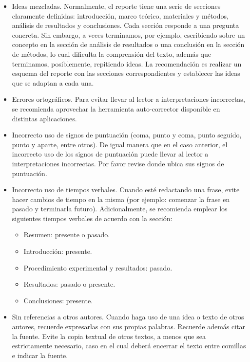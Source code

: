\begin{itemize}
    \item Ideas mezcladas. Normalmente, el reporte tiene una serie de secciones claramente definidas: introducción, marco teórico, materiales y métodos, análisis de resultados y conclusiones. Cada sección responde a una pregunta concreta. Sin embargo, a veces terminamos, por ejemplo, escribiendo sobre un concepto en la sección de análisis de resultados o una conclusión en la sección de métodos, lo cual dificulta la comprensión del texto, además que terminamos, posiblemente, repitiendo ideas. La recomendación es realizar un esquema del reporte con las secciones correspondientes y establecer las ideas que se adaptan a cada una. 

    \item Errores ortográficos. Para evitar llevar al lector a interpretaciones incorrectas, se recomienda aprovechar la herramienta auto-corrector disponible en distintas aplicaciones.

    \item Incorrecto uso de signos de puntuación (coma, punto y coma, punto seguido, punto y aparte, entre otros). De igual manera que en el caso anterior, el incorrecto uso de los signos de puntuación puede llevar al lector a interpretaciones incorrectas. Por favor revise donde ubica sus signos de puntuación. 

    \item Incorrecto uso de tiempos verbales. Cuando esté redactando una frase, evite hacer cambios de tiempo en la misma (por ejemplo: comenzar la frase en pasado y terminarla futuro). Adicionalmente, se recomienda emplear los siguientes tiempos verbales de acuerdo con la sección:

    \begin{itemize}
        \item Resumen: presente o pasado.
        \item Introducción: presente.
        \item Procedimiento experimental y resultados: pasado.
        \item Resultados: pasado o presente.
        \item Conclusiones: presente.
    \end{itemize}

    \item Sin referencias a otros autores. Cuando haga uso de una idea o texto de otros autores, recuerde expresarlas con sus propias palabras. Recuerde además citar la fuente. Evite la copia textual de otros textos, a menos que sea estrictamente necesario, caso en el cual deberá encerrar el texto entre comillas e indicar la fuente.
\end{itemize}






